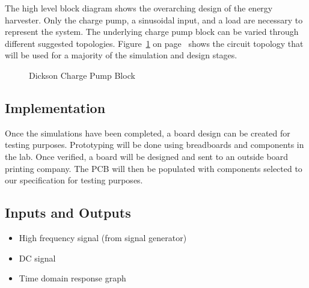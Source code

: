 \documentclass[12pt]{article}
\begin{document}
\noindent The high level block diagram shows the overarching design of the energy harvester. Only the charge pump, a sinusoidal input, and a load are necessary to represent the system. The underlying charge pump block can be varied through different suggested topologies. Figure~\ref{fig:DicksonCP}  on page~\pageref{fig:DicksonCP} shows the circuit topology that will be used for a majority of the simulation and design stages.

\vspace{0.5em}
\begin{figure}[H]
\caption{Dickson Charge Pump Block \cite{Guler}}
\label{fig:DicksonCP}
\end{figure}

	\subsection{Implementation}
	Once the simulations have been completed, a board design can be created for testing purposes. Prototyping will be done using breadboards and components in the lab. Once verified, a board will be designed and sent to an outside board printing company. The PCB will then be populated with components selected to our specification for testing purposes.
	
	\subsection{Inputs and Outputs}
	
	\begin{itemize}
		\item High frequency signal (from signal generator)
	\end{itemize}
	\begin{itemize}
		\item DC signal
		\item Time domain response graph
	\end{itemize}
	
\end{document}
